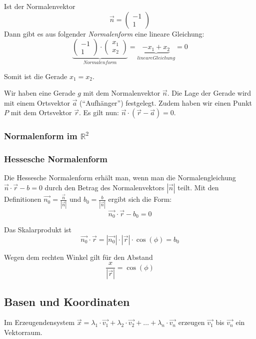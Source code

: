 Ist der Normalenvektor
\[ \vec{n} = \left( \begin{array}{r} -1 \\ 1 \end{array} \right) \]
Dann gibt es aus folgender \emph{Normalenform} eine lineare
Gleichung:
\[ \underbrace{\left( \begin{array}{r} -1 \\ 1 \end{array} \right) \cdot
  \left( \begin{array}{r} x_1 \\ x_2 \end{array} \right)}_{Normalenform}
  = \underbrace{-x_1 + x_2}_{lineare Gleichung} = 0 \]

Somit ist die Gerade $x_1 = x_2$.

Wir haben eine Gerade $g$ mit dem Normalenvektor $\vec{n}$. Die Lage der Gerade
wird mit einem Ortsvektor $\vec{a}$ ("`Aufhänger"') festgelegt. Zudem
haben wir einen Punkt $P$ mit dem Ortsvektor $\vec{r}$. Es gilt nun: $\vec{n}
\cdot (\vec{r} - \vec{a}) = 0$.

\subsubsection{Normalenform im $\mathbb{R}^2$}

\subsubsection{Hessesche Normalenform}
Die Hessesche Normalenform erhält man, wenn man die Normalengleichung
$\vec{n} \cdot \vec{r} - b = 0$ durch den Betrag des Normalenvektors
$|\vec{n}|$ teilt. Mit den Definitionen $\vec{n_0} =
\frac{\vec{n}}{|\vec{n}|}$ und $b_0 = \frac{b}{|\vec{n}|}$ ergibt sich
die Form:
\[ \vec{n_0} \cdot \vec{r} - b_0 = 0 \]

Das Skalarprodukt ist
\[ \vec{n_0} \cdot \vec{r} = |\vec{n_0}| \cdot |\vec{r}| \cdot
\cos(\phi) = b_0 \]

Wegen dem rechten Winkel gilt für den Abstand
\[ \frac{x}{|\vec{r}|} = \cos(\phi)\]

\subsection{Basen und Koordinaten}
Im Erzeugendensystem $\vec{x} = \lambda_1 \cdot \vec{v_1} + \lambda_2
\cdot \vec{v_2} + \dots + \lambda_n \cdot \vec{v_n}$ erzeugen
$\vec{v_1}$ bis $\vec{v_n}$ ein Vektorraum.


